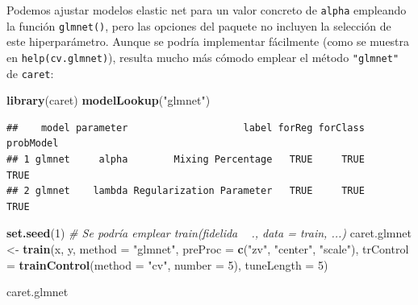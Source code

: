 \documentclass[
]{book}
\newenvironment{Shaded}{\begin{snugshade}}{\end{snugshade}}
\newcommand{\CommentTok}[1]{\textcolor[rgb]{0.56,0.35,0.01}{\textit{#1}}}
\newcommand{\DataTypeTok}[1]{\textcolor[rgb]{0.13,0.29,0.53}{#1}}
\newcommand{\DecValTok}[1]{\textcolor[rgb]{0.00,0.00,0.81}{#1}}
\newcommand{\KeywordTok}[1]{\textcolor[rgb]{0.13,0.29,0.53}{\textbf{#1}}}
\newcommand{\NormalTok}[1]{#1}
\newcommand{\StringTok}[1]{\textcolor[rgb]{0.31,0.60,0.02}{#1}}
\theoremstyle{break}
\theoremstyle{definition}
\theoremstyle{definition}
\theoremstyle{definition}
\theoremstyle{remark}
\begin{document}
Podemos ajustar modelos elastic net para un valor concreto de \texttt{alpha} empleando la función \texttt{glmnet()}, pero las opciones del paquete no incluyen la selección de este hiperparámetro.
Aunque se podría implementar fácilmente (como se muestra en \texttt{help(cv.glmnet)}), resulta mucho más cómodo emplear el método \texttt{"glmnet"} de \texttt{caret}:

\begin{Shaded}
\begin{Highlighting}[]
\KeywordTok{library}\NormalTok{(caret)}
\KeywordTok{modelLookup}\NormalTok{(}\StringTok{"glmnet"}\NormalTok{) }
\end{Highlighting}
\end{Shaded}

\begin{verbatim}
##    model parameter                    label forReg forClass probModel
## 1 glmnet     alpha        Mixing Percentage   TRUE     TRUE      TRUE
## 2 glmnet    lambda Regularization Parameter   TRUE     TRUE      TRUE
\end{verbatim}

\begin{Shaded}
\begin{Highlighting}[]
\KeywordTok{set.seed}\NormalTok{(}\DecValTok{1}\NormalTok{)}
\CommentTok{# Se podría emplear train(fidelida ~ ., data = train, ...)}
\NormalTok{caret.glmnet <-}\StringTok{ }\KeywordTok{train}\NormalTok{(x, y, }\DataTypeTok{method =} \StringTok{"glmnet"}\NormalTok{,}
    \DataTypeTok{preProc =} \KeywordTok{c}\NormalTok{(}\StringTok{"zv"}\NormalTok{, }\StringTok{"center"}\NormalTok{, }\StringTok{"scale"}\NormalTok{),}
    \DataTypeTok{trControl =} \KeywordTok{trainControl}\NormalTok{(}\DataTypeTok{method =} \StringTok{"cv"}\NormalTok{, }\DataTypeTok{number =} \DecValTok{5}\NormalTok{),}
    \DataTypeTok{tuneLength =} \DecValTok{5}\NormalTok{)}


\NormalTok{caret.glmnet}
\end{Highlighting}
\end{Shaded}
\end{document}
